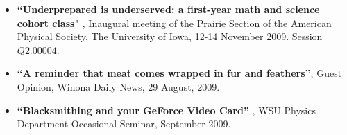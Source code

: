 \documentclass[margin,line,letterpaper]{res}
\begin{document}
\begin{resume}
\begin{itemize}

\item %
\textbf{``Underprepared is underserved: a first-year math and science cohort class"}%
, Inaugural meeting of the Prairie Section of the American Physical Society. 
The University of Iowa, 12-14 November 2009. Session $Q2.00004$.  



\item 
\textbf{``A reminder that meat comes wrapped in fur and feathers''},
Guest Opinion, Winona Daily News, 29 August, 2009.


\item 
\textbf{``Blacksmithing and your GeForce Video Card''}%
, WSU Physics Department Occasional Seminar, September 2009.



\end{itemize}
\end{resume}
\end{document}
